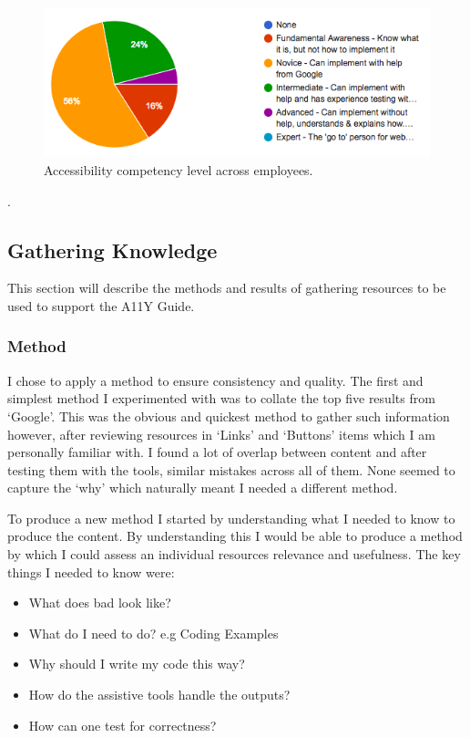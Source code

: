 \begin{figure}[H]
\centering
\centering
\includegraphics[width=\textwidth]{figures/questions/a11y_level}
\captionsetup{justification=centering}
\caption{Accessibility competency level across employees.
\label{fig:a11y_level}}
\end{figure}.

\subsection{Gathering Knowledge}
\label{sec:GatheringKnowledge}
This section will describe the methods and results of gathering resources to
be used to support the A11Y Guide.

\subsubsection{Method}
I chose to apply a method to ensure consistency and quality. The first and
simplest method I experimented with was to collate the top five results from
`Google'. This was the obvious and quickest method to gather such information
however, after reviewing resources in `Links' and `Buttons' items which I am
personally familiar with. I found a lot of overlap between content and after
testing them with the tools, similar mistakes across all of them.
None seemed to capture the `why' which naturally meant I needed a
different method.

To produce a new method I started by understanding what I needed to know to
produce the content. By understanding this I would be able to produce a method
by which I could assess an individual resources relevance and usefulness. The
key things I needed to know were:

\begin {itemize}
\item What does bad look like?
\item What do I need to do? e.g Coding Examples
\item Why should I write my code this way?
\item How do the assistive tools handle the outputs?
\item How can one test for correctness?
\end{itemize}

